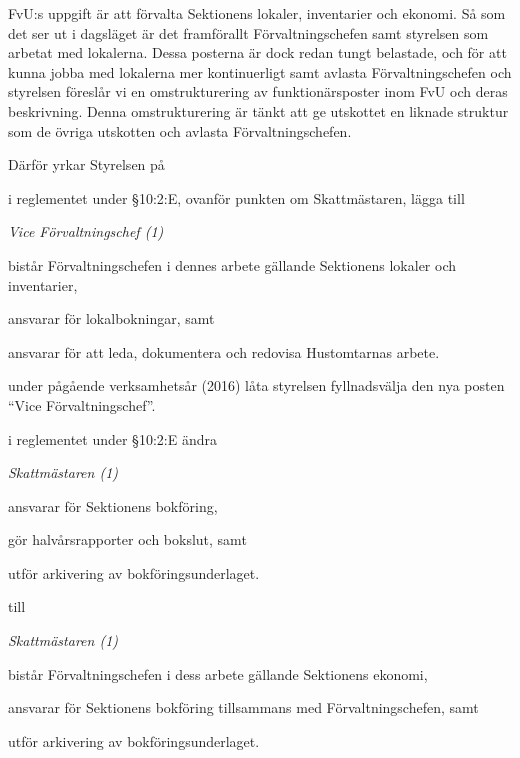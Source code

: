 \documentclass[../_main/handlingar.tex]{subfiles}
\begin{document}
FvU:s uppgift är att förvalta Sektionens lokaler, inventarier och ekonomi. Så som det ser ut i dagsläget är det framförallt Förvaltningschefen samt styrelsen som arbetat med lokalerna. Dessa posterna är dock redan tungt belastade, och för att kunna jobba med lokalerna mer kontinuerligt samt avlasta Förvaltningschefen och styrelsen föreslår vi en omstrukturering av funktionärsposter inom FvU och deras beskrivning.  Denna omstrukturering är tänkt att ge utskottet en liknade struktur som de övriga utskotten och avlasta Förvaltningschefen.

Därför yrkar Styrelsen på
\begin{attsatser}
    \att i reglementet under \S10:2:E, ovanför punkten om Skattmästaren, lägga till\par
    {\it
    Vice Förvaltningschef (1)
    \begin{tightdashlist}
        \item bistår Förvaltningschefen i dennes arbete gällande Sektionens lokaler och inventarier,
        \item ansvarar för lokalbokningar, samt
        \item ansvarar för att leda, dokumentera och redovisa Hustomtarnas arbete.
    \end{tightdashlist}
    }

    \att under pågående verksamhetsår (2016) låta styrelsen fyllnadsvälja den nya posten ``Vice Förvaltningschef''.

    \att i reglementet under \S10:2:E ändra\par
    {\it
    Skattmästaren (1)
    \begin{tightdashlist}
        \item ansvarar för Sektionens bokföring,
        \item gör halvårsrapporter och bokslut, samt
        \item utför arkivering av bokföringsunderlaget.
    \end{tightdashlist}
    }
    till\par
    {\it
    Skattmästaren (1)
    \begin{tightdashlist}
        \item bistår Förvaltningschefen i dess arbete gällande Sektionens ekonomi,
        \item ansvarar för Sektionens bokföring tillsammans med Förvaltningschefen, samt
        \item utför arkivering av bokföringsunderlaget.
    \end{tightdashlist}
    }


\end{attsatser}
\end{document}
